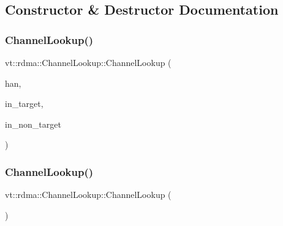 \subsection{Constructor \& Destructor Documentation}
\mbox{\label{structvt_1_1rdma_1_1_channel_lookup_a6e438b399a526542f97ef6cbf96a7378}} 
\subsubsection{\texorpdfstring{Channel\+Lookup()}{ChannelLookup()}\hspace{0.1cm}{\footnotesize\ttfamily [1/2]}}
{\footnotesize\ttfamily vt\+::rdma\+::\+Channel\+Lookup\+::\+Channel\+Lookup (\begin{DoxyParamCaption}\item[{\hyperlink{namespacevt_a10442579ec4e7ebef223818e64bcf908}{R\+D\+M\+A\+\_\+\+Handle\+Type} const \&}]{han,  }\item[{\hyperlink{namespacevt_a866da9d0efc19c0a1ce79e9e492f47e2}{Node\+Type} const \&}]{in\+\_\+target,  }\item[{\hyperlink{namespacevt_a866da9d0efc19c0a1ce79e9e492f47e2}{Node\+Type} const \&}]{in\+\_\+non\+\_\+target }\end{DoxyParamCaption})\hspace{0.3cm}{\ttfamily [inline]}}

\mbox{\label{structvt_1_1rdma_1_1_channel_lookup_af5ffd2e82bd5972d35f03be34279e4d6}} 
\subsubsection{\texorpdfstring{Channel\+Lookup()}{ChannelLookup()}\hspace{0.1cm}{\footnotesize\ttfamily [2/2]}}
{\footnotesize\ttfamily vt\+::rdma\+::\+Channel\+Lookup\+::\+Channel\+Lookup (\begin{DoxyParamCaption}\item[{\hyperlink{structvt_1_1rdma_1_1_channel_lookup}{Channel\+Lookup} const \&}]{ }\end{DoxyParamCaption})\hspace{0.3cm}{\ttfamily [default]}}



